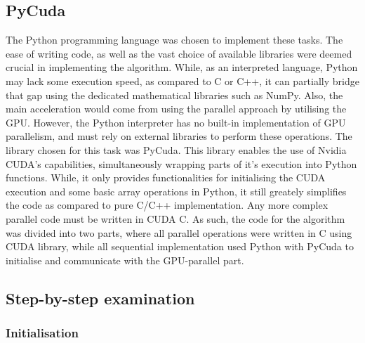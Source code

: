 \documentclass[12pt, oneside]{report}
\begin{document}
\subsection{PyCuda}

The Python programming language was chosen to implement these tasks. The ease of writing code, as well as the vast choice of available libraries were deemed crucial in implementing the algorithm. While, as an interpreted language, Python may lack some execution speed, as compared to C or C++, it can partially bridge that gap using the dedicated mathematical libraries such as NumPy. Also, the main acceleration would come from using the parallel approach by utilising the GPU\cite{numpy}. \newline
However, the Python interpreter has no built-in implementation of GPU parallelism, and must rely on external libraries to perform these operations. The library chosen for this task was PyCuda. This library enables the use of Nvidia CUDA's capabilities, simultaneously wrapping parts of it's execution into Python functions. While, it only provides functionalities for initialising the CUDA execution and some basic array operations in Python, it still greately simplifies the code as compared to pure C/C++ implementation. Any more complex parallel code must be written in CUDA C. As such, the code for the algorithm was divided into two parts, where all parallel operations were written in C using CUDA library, while all sequential implementation used Python with PyCuda to initialise and communicate with the GPU-parallel part\cite{pycuda}.


\subsection{Step-by-step examination}

\subsubsection{Initialisation}
\end{document}
